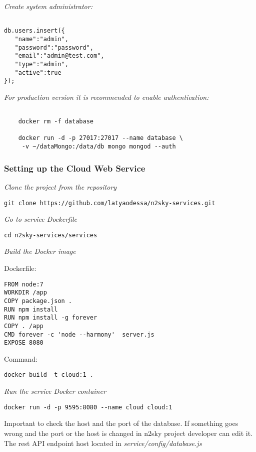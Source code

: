 \emph{Create system administrator:}
 \begin{lstlisting}
 
db.users.insert({
   "name":"admin",
   "password":"password",
   "email":"admin@test.com",
   "type":"admin",
   "active":true
});

\end{lstlisting}


\emph{For production version it is recommended to enable authentication:}
 \begin{lstlisting}
 
 	docker rm -f database
 
	docker run -d -p 27017:27017 --name database \
	 -v ~/dataMongo:/data/db mongo mongod --auth

\end{lstlisting}



\subsubsection{Setting up the Cloud Web Service}\label{cloud setup}

\emph{Clone the project from the repository}
 \begin{lstlisting}
git clone https://github.com/latyaodessa/n2sky-services.git 
\end{lstlisting}

\emph{Go to service Dockerfile}
 \begin{lstlisting}
cd n2sky-services/services
\end{lstlisting}

\emph{Build the Docker image}

Dockerfile:
 \begin{lstlisting}
FROM node:7
WORKDIR /app
COPY package.json .
RUN npm install
RUN npm install -g forever
COPY . /app
CMD forever -c 'node --harmony'  server.js
EXPOSE 8080
\end{lstlisting}

Command: 
 \begin{lstlisting}
docker build -t cloud:1 .
\end{lstlisting}


\emph{Run the service Docker container}
 \begin{lstlisting}
docker run -d -p 9595:8080 --name cloud cloud:1
\end{lstlisting}


Important to check the host and the port of the database. 
If something goes wrong and the port or the host is changed in n2sky project developer can edit it.
The rest API endpoint host located in \emph{service/config/database.js}

